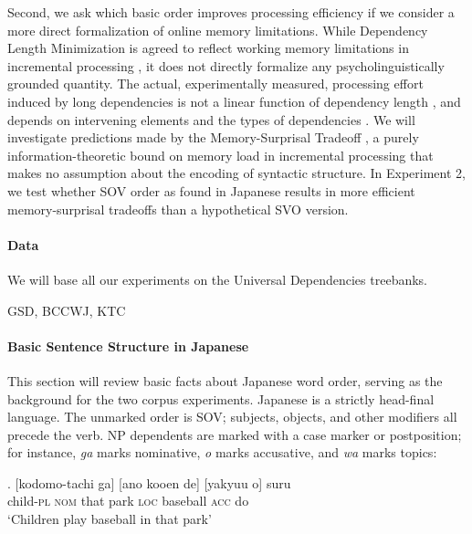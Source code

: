 \documentclass[11pt,a4paper]{article}
\begin{document}
Second, we ask which basic order improves processing efficiency
if we consider a more direct formalization of online memory limitations.
While Dependency Length Minimization is agreed to reflect working memory limitations in incremental processing \citep{hawkins1994performance, futrell2015largescale, temperley2018minimizing}, it does not directly formalize any psycholinguistically grounded quantity.
The actual, experimentally measured, processing effort induced by long dependencies is not a linear function of dependency length \citep{gibson1998linguistic}, and depends on intervening elements \citep{gibson1998linguistic, lewis-activation-based-2005} and the types of dependencies \citep{demberg-data-2008}.
We will investigate predictions made by  %
the Memory-Surprisal Tradeoff \citep{hahn2019memory}, a purely information-theoretic bound on memory load in incremental processing that makes no assumption about the encoding of syntactic structure.
In Experiment 2, we test whether SOV order as found in Japanese results in more efficient memory-surprisal tradeoffs than a hypothetical SVO version.

\paragraph{Data}
We will base all our experiments on the Universal Dependencies \citep{nivre2019universal} treebanks.

GSD, BCCWJ, KTC



\paragraph{Basic Sentence Structure in Japanese}
This section will review basic facts about Japanese word order, serving as the background for the two corpus experiments.
Japanese is a strictly head-final language. The unmarked order is SOV; subjects, objects, and other modifiers all precede the verb.
NP dependents are marked with a case marker or postposition; for instance, \emph{ga} marks nominative, \emph{o} marks accusative, and \emph{wa} marks topics:


\exg. [kodomo-tachi ga] [ano kooen de] [yakyuu o] suru \\
child-\textsc{pl} \textsc{nom} that park \textsc{loc} baseball \textsc{acc} do \\
`Children play baseball in that park' \citep[p. 118]{iwasaki2013japanese}
\end{document}

